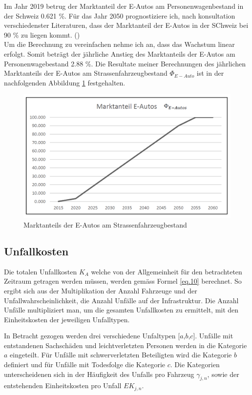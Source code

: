 Im Jahr 2019 betrug der Marktanteil der E-Autos am Personenwagenbestand in der Schweiz 0.621 \%. Für das Jahr 2050 prognostiziere ich, nach konsultation verschiedenster Literaturen, dass der Marktanteil der E-Autos in der SChweiz bei 90 \% zu liegen kommt. (\cite{Bestand2019}) \\
Um die Berechnung zu vereinfachen nehme ich an, dass das Wachstum linear erfolgt. Somit beträgt der jährliche Anstieg des Marktanteils der E-Autos am Personenwagebestand 2.88 \%. Die Resultate meiner Berechnungen des jährlichen Marktanteils der E-Autos am Strassenfahrzeugbestand \( \Phi_{E-Auto} \) ist in der nachfolgenden Abbildung \ref{img:Marktanteil} festgehalten. 

\begin{figure}[h!]
	\centering
	\includegraphics[width=.6\textwidth]{figures/04-04-01-MarktanteilE-Auto}
	\caption[Marktanteil E-Autos]{Marktanteils der E-Autos am Strassenfahrzeugbestand}
	\label{img:Marktanteil}
\end{figure}



\pagebreak


\subsection*{Unfallkosten}
\label{subsec:Unfall}

Die totalen Unfallkosten $K_{A}$ welche von der Allgemeinheit für den betrachteten Zeitraum getragen werden müssen, werden gemäss Formel \ref{eq.10} berechnet. So ergibt sich aus der Multiplikation der Anzahl Fahrzeuge und der Unfallwahrscheinlichkeit, die Anzahl Unfälle auf der Infrastruktur. Die Anzahl Unfälle multipliziert man, um die gesamten Unfallkosten zu ermittelt, mit den Einheitskosten der jeweiligen Unfalltypen.

In Betracht gezogen werden drei verschiedene Unfaltypen [$a$,$b$,$c$].
Unfälle mit entstandenen Sachschäden und leichtverletzten Personen werden in die Kategorie $a$ eingeteilt. Für Unfälle mit schwerverletzten Beteiligten wird die Kategorie $b$ definiert und für Unfälle mit Todesfolge die Kategorie $c$. 
Die Kategorien unterscheidenen sich in der Häufigkeit des Unfalls pro Fahrzeug \( \gamma_{j,n} \), sowie der entstehenden Einheitskosten pro Unfall $EK_{j,n}$.

